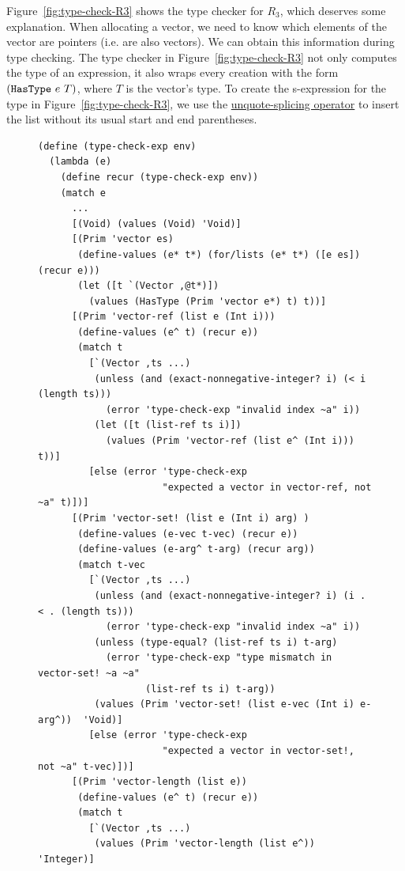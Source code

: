 \documentclass[11pt]{book}
\begin{document}
Figure~\ref{fig:type-check-R3} shows the type checker for $R_3$, which
deserves some explanation. When allocating a vector, we need to know
which elements of the vector are pointers (i.e. are also vectors). We
can obtain this information during type checking. The type checker in
Figure~\ref{fig:type-check-R3} not only computes the type of an
expression, it also wraps every  creation with the form
$(\texttt{HasType}~e~T)$, where $T$ is the vector's type.
%
To create the s-expression for the  type in
Figure~\ref{fig:type-check-R3}, we use the
\href{https://docs.racket-lang.org/reference/quasiquote.html}{unquote-splicing
  operator}  to insert the list  without its usual
start and end parentheses.  


\begin{figure}[tp]
\begin{lstlisting}[basicstyle=\ttfamily\scriptsize]
(define (type-check-exp env)
  (lambda (e)
    (define recur (type-check-exp env))
    (match e
      ...
      [(Void) (values (Void) 'Void)]
      [(Prim 'vector es)
       (define-values (e* t*) (for/lists (e* t*) ([e es]) (recur e)))
       (let ([t `(Vector ,@t*)])
         (values (HasType (Prim 'vector e*) t) t))]
      [(Prim 'vector-ref (list e (Int i)))
       (define-values (e^ t) (recur e))
       (match t
         [`(Vector ,ts ...)
          (unless (and (exact-nonnegative-integer? i) (< i (length ts)))
            (error 'type-check-exp "invalid index ~a" i))
          (let ([t (list-ref ts i)])
            (values (Prim 'vector-ref (list e^ (Int i)))  t))]
         [else (error 'type-check-exp
                      "expected a vector in vector-ref, not ~a" t)])]
      [(Prim 'vector-set! (list e (Int i) arg) )
       (define-values (e-vec t-vec) (recur e))
       (define-values (e-arg^ t-arg) (recur arg))
       (match t-vec
         [`(Vector ,ts ...)
          (unless (and (exact-nonnegative-integer? i) (i . < . (length ts)))
            (error 'type-check-exp "invalid index ~a" i))
          (unless (type-equal? (list-ref ts i) t-arg)
            (error 'type-check-exp "type mismatch in vector-set! ~a ~a" 
                   (list-ref ts i) t-arg))
          (values (Prim 'vector-set! (list e-vec (Int i) e-arg^))  'Void)]
         [else (error 'type-check-exp
                      "expected a vector in vector-set!, not ~a" t-vec)])]
      [(Prim 'vector-length (list e))
       (define-values (e^ t) (recur e))
       (match t
         [`(Vector ,ts ...)
          (values (Prim 'vector-length (list e^))  'Integer)]

\end{lstlisting}
\end{figure}
\end{document}
